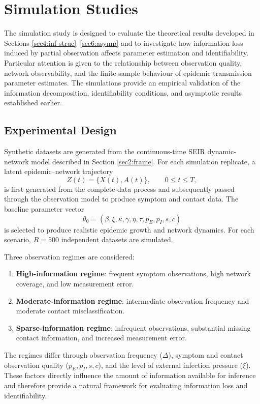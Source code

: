 \documentclass[10pt]{article}
\begin{document}
\section{Simulation Studies}
\label{sec7:sim}
The simulation study is designed to evaluate the theoretical results developed in Sections \ref{sec4:inf-struc}--\ref{sec6:asymp} and to investigate how information loss induced by partial observation affects parameter estimation and identifiability. Particular attention is given to the relationship between observation quality, network observability, and the finite-sample behaviour of epidemic transmission parameter estimates. The simulations provide an empirical validation of the information decomposition, identifiability conditions, and asymptotic results established earlier.

\subsection{Experimental Design}
Synthetic datasets are generated from the continuous-time SEIR dynamic-network model described in Section \ref{sec2:frame}. For each simulation replicate, a latent epidemic--network trajectory
\[
Z(t)=\{X(t),A(t)\}, \qquad 0\le t\le T,
\]
is first generated from the complete-data process and subsequently passed through the observation model to produce symptom and contact data. The baseline parameter vector
\[
\theta_0 = (\beta,\xi,\kappa,\gamma,\eta,\tau,p_E,p_I,s,c)
\]
is selected to produce realistic epidemic growth and network dynamics. For each scenario, $R=500$ independent datasets are simulated.

Three observation regimes are considered:
\begin{enumerate}
\item \textbf{High-information regime}: frequent symptom observations, high network coverage, and low measurement error.
\item \textbf{Moderate-information regime}: intermediate observation frequency and moderate contact misclassification.
\item \textbf{Sparse-information regime}: infrequent observations, substantial missing contact information, and increased measurement error.
\end{enumerate}
The regimes differ through observation frequency ($\Delta$), symptom and contact observation quality ($p_E,p_I,s,c$), and the level of external infection pressure ($\xi$). These factors directly influence the amount of information available for inference and therefore provide a natural framework for evaluating information loss and identifiability.
\end{document}

